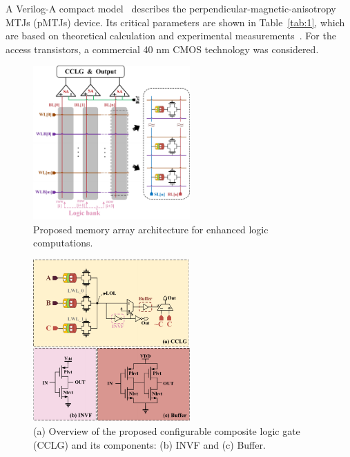 \documentclass[submit]{elex2024}%
\begin{document}
\noindent
A Verilog-A compact model~\cite{26} describes the perpendicular-magnetic-anisotropy MTJs (pMTJs) device. Its critical parameters are shown in Table~\ref{tab:1}, which are based on theoretical calculation and experimental measurements~\cite{27}. For the access transistors, a commercial 40 nm CMOS technology was considered.
\begin{figure}[htb]
    \centering
    \includegraphics[width=6cm]{Figures/fig2.pdf}
    \caption{Proposed memory array architecture for enhanced logic computations.}
    \label{fig:2}
\end{figure}
\begin{figure}[htb]
    \begin{center}
    \includegraphics[width=6cm]{Figures/fig3.pdf}
    \end{center}
    \caption{(a) Overview of the proposed configurable composite logic gate (CCLG) and its components: (b) INVF and (c) Buffer.}
    \label{fig:3}
\end{figure}
\end{document}
